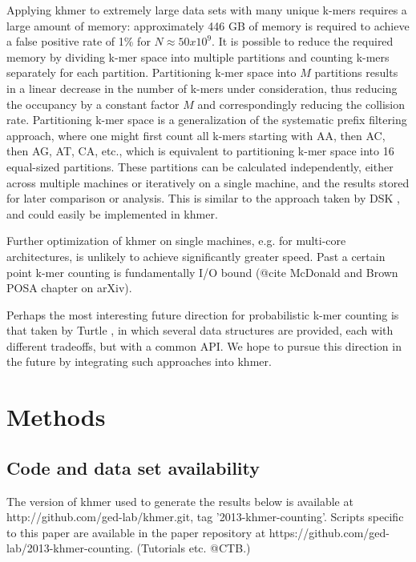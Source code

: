 \documentclass{article}
\begin{document}
Applying khmer to extremely large data sets with many unique k-mers
requires a large amount of memory: approximately 446 GB of memory is
required to achieve a false positive rate of 1\% for $N \approx
50x10^9$. It is possible to reduce the required memory by dividing
k-mer space into multiple partitions and counting k-mers separately
for each partition. Partitioning k-mer space into $M$ partitions
results in a linear decrease in the number of k-mers under
consideration, thus reducing the occupancy by a constant factor $M$
and correspondingly reducing the collision rate.  Partitioning k-mer
space is a generalization of the systematic prefix filtering approach,
where one might first count all k-mers starting with AA, then AC, then
AG, AT, CA, etc., which is equivalent to partitioning k-mer space into
16 equal-sized partitions. These partitions can be calculated
independently, either across multiple machines or iteratively on a
single machine, and the results stored for later comparison or
analysis.  This is similar to the approach taken by DSK
\cite{Rizk2013}, and could easily be implemented in khmer.

Further optimization of khmer on single machines, e.g. for multi-core
architectures, is unlikely to achieve significantly greater speed.
Past a certain point k-mer counting is fundamentally I/O bound
(@cite McDonald and Brown POSA chapter on arXiv).

Perhaps the most interesting future direction for probabilistic k-mer
counting is that taken by Turtle \cite{Roy2013}, in which several
data structures are provided, each with different tradeoffs, but with
a common API.  We hope to pursue this direction in the future by
integrating such approaches into khmer.

\section{Methods}

\subsection{Code and data set availability}


The version of khmer used to generate the results below is available
at http://github.com/ged-lab/khmer.git, tag '2013-khmer-counting'.
Scripts specific to this paper are available in the paper repository
at https://github.com/ged-lab/2013-khmer-counting.  (Tutorials etc. @CTB.)
\end{document}
